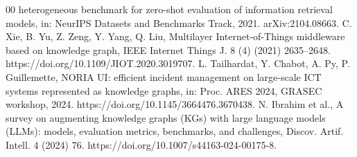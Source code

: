 \documentclass[a4paper,fleqn]{cas-dc}
\begin{document}
\begin{thebibliography}{00}
heterogeneous benchmark for zero-shot evaluation of information retrieval
models, in: NeurIPS Datasets and Benchmarks Track, 2021. arXiv:2104.08663.
C. Xie, B. Yu, Z. Zeng, Y. Yang, Q. Liu, Multilayer Internet-of-Things
middleware based on knowledge graph, IEEE Internet Things J. 8 (4) (2021)
2635--2648. https://doi.org/10.1109/JIOT.2020.3019707.
L. Tailhardat, Y. Chabot, A. Py, P. Guillemette, NORIA UI: efficient incident
management on large-scale ICT systems represented as knowledge graphs, in:
Proc. ARES 2024, GRASEC workshop, 2024.
https://doi.org/10.1145/3664476.3670438.
N. Ibrahim et al., A survey on augmenting knowledge graphs (KGs) with large
language models (LLMs): models, evaluation metrics, benchmarks, and challenges,
Discov. Artif. Intell. 4 (2024) 76. https://doi.org/10.1007/s44163-024-00175-8.
\end{thebibliography}
\end{document}
